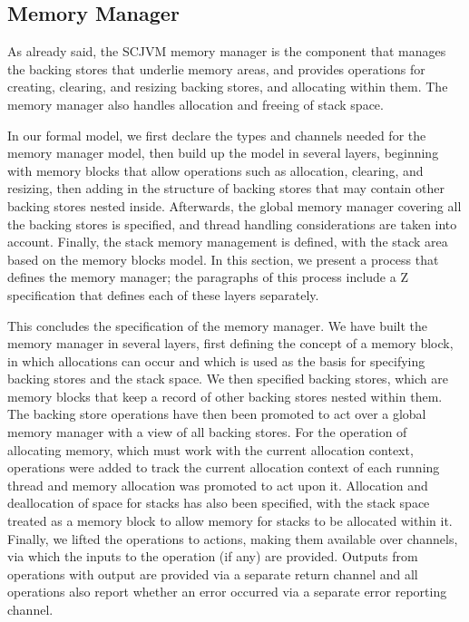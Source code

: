 \subsection{Memory Manager}
\label{memory-manager-model-section}

As already said, the SCJVM memory manager is the component that
manages the backing stores that underlie memory areas, and provides
operations for creating, clearing, and resizing backing stores, and
allocating within them.
The memory manager also handles allocation and freeing of stack space.

In our formal model, we first declare the types and channels needed
for the memory manager model, then build up the model in several
layers, beginning with memory blocks that allow operations such as
allocation, clearing, and resizing, then adding in the structure of
backing stores that may contain other backing stores nested inside.
Afterwards, the global memory manager covering all the backing stores
is specified, and thread handling considerations are taken into
account.
Finally, the stack memory management is defined, with the stack area
based on the memory blocks model.
In this section, we present a \Circus{} process that defines the
memory manager; the paragraphs of this process include a Z
specification that defines each of these layers separately.



This concludes the specification of the memory manager.
We have built the memory manager in several layers, first defining the
concept of a memory block, in which allocations can occur and which is
used as the basis for specifying backing stores and the stack space.
We then specified backing stores, which are memory blocks that keep a
record of other backing stores nested within them.
The backing store operations have then been promoted to act over a
global memory manager with a view of all backing stores.
For the operation of allocating memory, which must work with the
current allocation context, operations were added to track the current
allocation context of each running thread and memory allocation was
promoted to act upon it.
Allocation and deallocation of space for stacks has also been
specified, with the stack space treated as a memory block to allow
memory for stacks to be allocated within it.
Finally, we lifted the operations to \Circus{} actions, making them
available over channels, via which the inputs to the operation (if
any) are provided.
Outputs from operations with output are provided via a separate return
channel and all operations also report whether an error occurred via a
separate error reporting channel.

